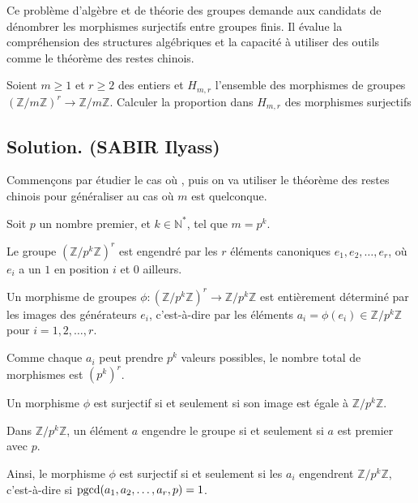 Ce probl{\`e}me d'alg{\`e}bre et de th{\'e}orie des groupes demande aux
candidats de d{\'e}nombrer les morphismes surjectifs entre groupes finis. Il
{\'e}value la compr{\'e}hension des structures alg{\'e}briques et la
capacit{\'e} {\`a} utiliser des outils comme le th{\'e}or{\`e}me des restes
chinois.
\begin{exercise}[]
Soient $m \geq 1$ et $r \geq 2$ des entiers et $H_{m, r}$ l'ensemble des
morphismes de groupes $(\mathbb{Z}/ m\mathbb{Z})^r \rightarrow \mathbb{Z}/
m\mathbb{Z}$. Calculer la proportion dans $H_{m, r}$ des morphismes surjectifs

\end{exercise}

\subsection*{Solution. (SABIR Ilyass)}


Commen{\c c}ons par {\'e}tudier le cas o{\`u} , puis on va utiliser le th{\'e}or{\`e}me des restes
chinois pour g{\'e}n{\'e}raliser au cas o{\`u} $m$ est quelconque.

Soit $p$ un nombre premier, et $k \in \mathbb{N}^{\ast}$, tel que $m = p^k$.

Le groupe $(\mathbb{Z}/ p^k \mathbb{Z})^r$ est engendr{\'e} par les $r$
{\'e}l{\'e}ments canoniques $e_1, e_2, \ldots, e_r$, o{\`u} $e_i$ a un $1$ en
position $i$ et $0$ ailleurs.

Un morphisme de groupes $\phi : (\mathbb{Z}/ p^k \mathbb{Z})^r \rightarrow
\mathbb{Z}/ p^k \mathbb{Z}$ est enti{\`e}rement d{\'e}termin{\'e} par les
images des g{\'e}n{\'e}rateurs $e_i$, c'est-{\`a}-dire par les
{\'e}l{\'e}ments $a_i = \phi (e_i) \in \mathbb{Z}/ p^k \mathbb{Z}$ pour $i =
1, 2, \ldots, r$.

Comme chaque $a_i$ peut prendre $p^k$ valeurs possibles, le nombre total de
morphismes est $(p^k)^r$.

Un morphisme $\phi$ est surjectif si et seulement si son image est {\'e}gale
{\`a} $\mathbb{Z}/ p^k \mathbb{Z}$.

Dans $\mathbb{Z}/ p^k \mathbb{Z}$, un {\'e}l{\'e}ment $a$ engendre le groupe
si et seulement si $a$ est premier avec $p$.

Ainsi, le morphisme $\phi$ est surjectif si et seulement si les $a_i$
engendrent $\mathbb{Z}/ p^k \mathbb{Z}$, c'est-{\`a}-dire si $\operatorname{pgcd}
(a_1, a_2, \ldots, a_r, p) = 1$.

